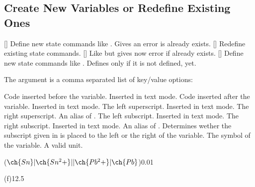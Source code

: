 \documentclass{chemmacros-manual}
\begin{document}
\subsection{Create New Variables or Redefine Existing Ones}

\begin{commands}
  []
    Define new state commands like .  Gives an error is 
    already exists.
  []
    Redefine existing state commands.
  []
    Like  but gives now error if  already exists.
  []
    Define new state commands like .  Defines  only if
    it is not defined, yet.
\end{commands}
The argument  is a comma separated list of key/value options:
\begin{options}
    Code inserted before the variable.  Inserted in text mode.
  \Default
    Code inserted after the variable.  Inserted in text mode.
  \Default
    The left superscript.  Inserted in text mode.
    The right superscript.
    An alias of .
  \Default
    The left subscript.  Inserted in text mode.
  \Default
    The right subscript.  Inserted in text mode.
    An alias of .
    Determines wether the subscript given in  is placed to the
    left or the right of the variable.
  \Default
    The symbol of the variable.
  \Default
    A valid  unit.
\end{options}

\begin{example}
  \NewChemState{}
  \NewChemState{}
   \par
   \par
  \ElPot[superscript=0]($\ch{Sn}|\ch{Sn^2+}||\ch{Pb^2+}|\ch{Pb}$){0.01} \par
  \RenewChemState{} \par
  \enthalpy(f){12.5}
\end{example}
\end{document}
